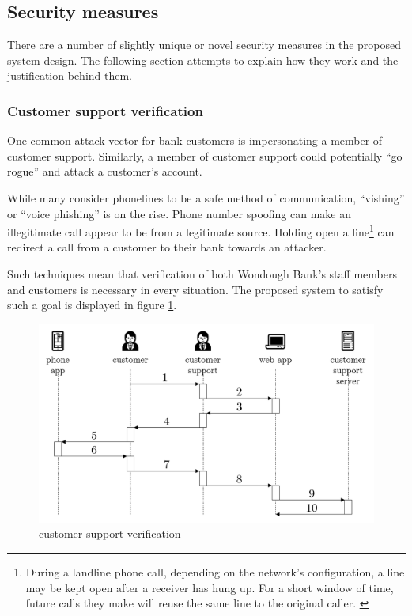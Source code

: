 \subsection{Security measures}

There are a number of slightly unique or novel security measures in the proposed system design. The following section attempts to explain how they work and the justification behind them.

\subsubsection{Customer support verification}

One common attack vector for bank customers is impersonating a member of customer support. Similarly, a member of customer support could potentially “go rogue” and attack a customer’s account.

While many consider phonelines to be a safe method of communication, “vishing” or “voice phishing” is on the rise. \cite{bbcPhone} \cite{bbcSmishing} Phone number spoofing can make an illegitimate call appear to be from a legitimate source. Holding open a line\footnote{
    During a landline phone call, depending on the network’s configuration, a line may be kept open after a receiver has hung up. For a short window of time, future calls they make will reuse the same line to the original caller. \cite{conArtists}
} can redirect a call from a customer to their bank towards an attacker.

Such techniques mean that verification of both Wondough Bank’s staff members and customers is necessary in every situation. The proposed system to satisfy such a goal is displayed in figure \ref{customerSupport}.

\begin{figure}
    \includegraphics[width=\columnwidth]{images/customer-support}
    \caption{customer support verification}
    \centering
    \label{customerSupport}
\end{figure}

